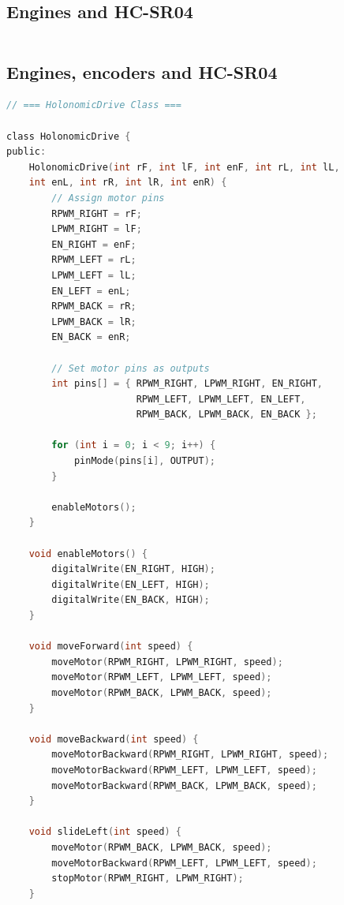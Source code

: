 \documentclass{article}
\begin{document}
\newpage
\subsection{Engines and HC-SR04}
\begin{lstlisting}[language=C, basicstyle=\ttfamily\footnotesize, frame=single, xleftmargin=10mm, xrightmargin=10mm]

\end{lstlisting}

\newpage
\subsection{Engines, encoders and HC-SR04}
\begin{lstlisting}[language=C, basicstyle=\ttfamily\footnotesize, frame=single, xleftmargin=10mm, xrightmargin=10mm]
// === HolonomicDrive Class ===

class HolonomicDrive {
public:
    HolonomicDrive(int rF, int lF, int enF, int rL, int lL, 
    int enL, int rR, int lR, int enR) {
        // Assign motor pins
        RPWM_RIGHT = rF;
        LPWM_RIGHT = lF;
        EN_RIGHT = enF;
        RPWM_LEFT = rL;
        LPWM_LEFT = lL;
        EN_LEFT = enL;
        RPWM_BACK = rR;
        LPWM_BACK = lR;
        EN_BACK = enR;

        // Set motor pins as outputs
        int pins[] = { RPWM_RIGHT, LPWM_RIGHT, EN_RIGHT,
                       RPWM_LEFT, LPWM_LEFT, EN_LEFT,
                       RPWM_BACK, LPWM_BACK, EN_BACK };

        for (int i = 0; i < 9; i++) {
            pinMode(pins[i], OUTPUT);
        }

        enableMotors();
    }

    void enableMotors() {
        digitalWrite(EN_RIGHT, HIGH);
        digitalWrite(EN_LEFT, HIGH);
        digitalWrite(EN_BACK, HIGH);
    }

    void moveForward(int speed) {
        moveMotor(RPWM_RIGHT, LPWM_RIGHT, speed);
        moveMotor(RPWM_LEFT, LPWM_LEFT, speed);
        moveMotor(RPWM_BACK, LPWM_BACK, speed);
    }

    void moveBackward(int speed) {
        moveMotorBackward(RPWM_RIGHT, LPWM_RIGHT, speed);
        moveMotorBackward(RPWM_LEFT, LPWM_LEFT, speed);
        moveMotorBackward(RPWM_BACK, LPWM_BACK, speed);
    }

    void slideLeft(int speed) {
        moveMotor(RPWM_BACK, LPWM_BACK, speed);
        moveMotorBackward(RPWM_LEFT, LPWM_LEFT, speed);
        stopMotor(RPWM_RIGHT, LPWM_RIGHT);
    }


\end{lstlisting}
\end{document}
